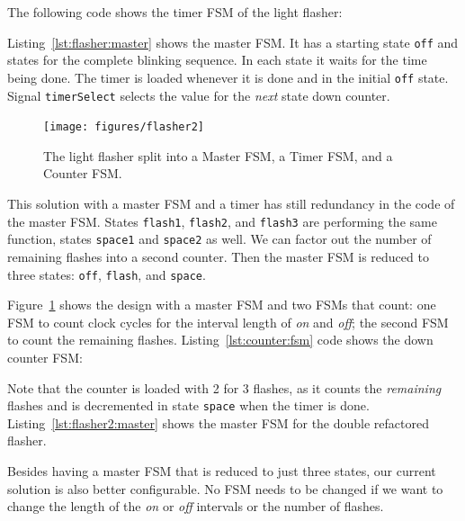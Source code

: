 \documentclass[%
    10pt,
    headinclude, footexclude,
    openright, %
    notitlepage,
    cleardoubleempty,
    headsepline,
    pointlessnumbers,
    bibtotoc, idxtotoc,
    ]{scrbook}
\newcommand{\code}[1]{{\small{\texttt{#1}}}}
\begin{document}
\noindent The following code shows the timer FSM of the light flasher:


\noindent Listing~\ref{lst:flasher:master} shows the master FSM. It has a starting
state \code{off} and states for the complete blinking sequence. In each state it
waits for the time being done. The timer is loaded whenever it is done and in the
initial \code{off} state. Signal \code{timerSelect} selects the value for the \emph{next}
state down counter.


\begin{figure}
  \centering
  \texttt{[image: figures/flasher2]}
  \caption{The light flasher split into a Master FSM, a Timer FSM, and a Counter FSM.}
  \label{fig:flasher2}
\end{figure}

This solution with a master FSM and a timer has still redundancy in the code
of the master FSM. States \code{flash1}, \code{flash2}, and \code{flash3}
are performing the same function, states \code{space1} and \code{space2} as well.
We can factor out the number of remaining flashes into a second counter.
Then the master FSM is reduced to three states: \code{off}, \code{flash},
and \code{space}.

Figure~\ref{fig:flasher2} shows the design with a master FSM and two FSMs
that count: one FSM to count clock cycles for the interval length of \emph{on}
and \emph{off}; the second FSM to count the remaining flashes.
Listing~\ref{lst:counter:fsm} code shows the down counter FSM:



\noindent Note that the counter is loaded with 2 for 3 flashes, as it counts the
\emph{remaining} flashes and is decremented in state \code{space} when the timer
is done. Listing~\ref{lst:flasher2:master} shows the master FSM for the double refactored flasher.


Besides having a master FSM that is reduced to just three states, our current solution
is also better configurable. No FSM needs to be changed if we want to change
the length of the \emph{on} or \emph{off} intervals or the number of flashes.
\end{document}
